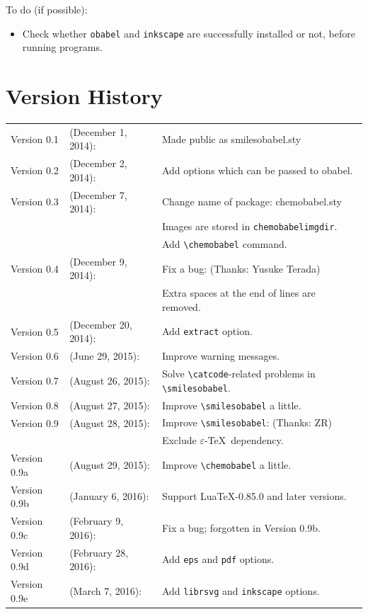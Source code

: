 \documentclass[12pt]{jsarticle}
\begin{document}
\clearpage

To do (if possible):
\begin{itemize}
\item Check whether \texttt{obabel} and \texttt{inkscape} are successfully installed or not, before running programs.
\end{itemize}

\section{Version History}

\begin{table}[h]
\centering
\begin{tabular}{lll}
Version 0.1 & (December  1, 2014): & Made public as \textsf{smilesobabel.sty} \\
Version 0.2 & (December  2, 2014): & Add options which can be passed to obabel. \\
Version 0.3 & (December  7, 2014): & Change name of package: \textsf{chemobabel.sty} \\
            &                      & Images are stored in \texttt{chemobabelimgdir}. \\
            &                      & Add \verb|\chemobabel| command. \\
Version 0.4 & (December  9, 2014): & Fix a bug: (Thanks: Yusuke Terada) \\
            &                      & Extra spaces at the end of lines are removed. \\
Version 0.5 & (December 20, 2014): & Add \verb|extract| option. \\
Version 0.6 & (June     29, 2015): & Improve warning messages. \\
Version 0.7 & (August   26, 2015): & Solve \verb|\catcode|-related problems in \verb|\smilesobabel|. \\
Version 0.8 & (August   27, 2015): & Improve \verb|\smilesobabel| a little. \\
Version 0.9 & (August   28, 2015): & Improve \verb|\smilesobabel|: (Thanks: ZR) \\
            &                      & Exclude $\varepsilon$-\TeX\ dependency. \\
Version 0.9a & (August   29, 2015): & Improve \verb|\chemobabel| a little. \\
Version 0.9b & (January   6, 2016): & Support Lua\TeX-0.85.0 and later versions. \\
Version 0.9c & (February  9, 2016): & Fix a bug; forgotten in Version 0.9b. \\
Version 0.9d & (February 28, 2016): & Add \verb|eps| and \verb|pdf| options. \\
Version 0.9e & (March     7, 2016): & Add \verb|librsvg| and \verb|inkscape| options.
\end{tabular}
\end{table}
\end{document}
